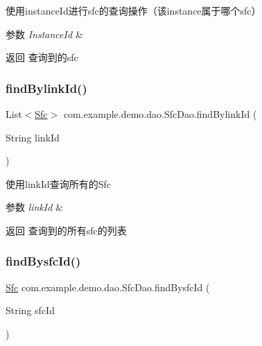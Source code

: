 使用instance\+Id进行sfc的查询操作（该instance属于哪个sfc） 
\begin{DoxyParams}{参数}
{\em Instance\+Id} & \\
\hline
\end{DoxyParams}
\begin{DoxyReturn}{返回}
查询到的sfc 
\end{DoxyReturn}
\mbox{\label{interfacecom_1_1example_1_1demo_1_1dao_1_1_sfc_dao_a987b199bbc98d689334f362641b370de}} 
\subsubsection{\texorpdfstring{find\+Bylink\+Id()}{findBylinkId()}}
{\footnotesize\ttfamily List$<$\mbox{\hyperlink{classcom_1_1example_1_1demo_1_1modular_1_1_sfc}{Sfc}}$>$ com.\+example.\+demo.\+dao.\+Sfc\+Dao.\+find\+Bylink\+Id (\begin{DoxyParamCaption}\item[{String}]{link\+Id }\end{DoxyParamCaption})}

使用link\+Id查询所有的\+Sfc 
\begin{DoxyParams}{参数}
{\em link\+Id} & \\
\hline
\end{DoxyParams}
\begin{DoxyReturn}{返回}
查询到的所有sfc的列表 
\end{DoxyReturn}
\mbox{\label{interfacecom_1_1example_1_1demo_1_1dao_1_1_sfc_dao_a96969784f7889c1b2d92c65f19c72e29}} 
\subsubsection{\texorpdfstring{find\+Bysfc\+Id()}{findBysfcId()}}
{\footnotesize\ttfamily \mbox{\hyperlink{classcom_1_1example_1_1demo_1_1modular_1_1_sfc}{Sfc}} com.\+example.\+demo.\+dao.\+Sfc\+Dao.\+find\+Bysfc\+Id (\begin{DoxyParamCaption}\item[{String}]{sfc\+Id }\end{DoxyParamCaption})}

